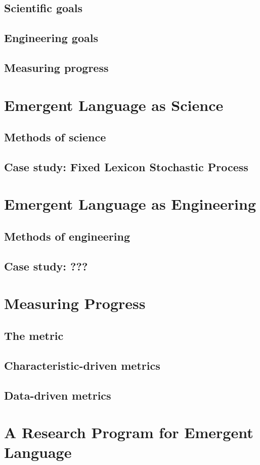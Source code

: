 \documentclass[letterpaper]{report}
\begin{document}
\section{Scientific goals}
\section{Engineering goals}
\section{Measuring progress}

\chapter{Emergent Language as Science}
\section{Methods of science}
\section{Case study: Fixed Lexicon Stochastic Process}

\chapter{Emergent Language as Engineering}
\section{Methods of engineering}
\section{Case study: ???}

\chapter{Measuring Progress}
\section{The metric}
\section{Characteristic-driven metrics}
\section{Data-driven metrics}

\chapter{A Research Program for Emergent Language}
\end{document}
